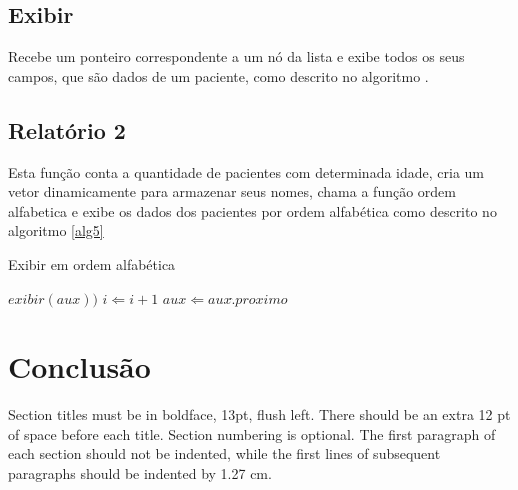 \documentclass[12pt]{article}
\begin{document}
\subsection{Exibir}

Recebe um ponteiro correspondente a um nó da lista e exibe todos os seus campos,
que são dados de um paciente, como descrito no algoritmo .


\subsection{Relatório 2}

Esta função conta a quantidade de pacientes com determinada idade, cria um vetor dinamicamente
para armazenar seus nomes, chama a função ordem alfabetica e exibe os dados dos pacientes por ordem
alfabética como descrito no algoritmo \ref{alg5}

\begin{algorithm}                      %
\caption{Exibir em ordem alfabética}          %
\label{alg5}                           %
\begin{algorithmic}
            \STATE $exibir(aux))$
            \STATE $i \Leftarrow i+1$
          \ENDIF
      \ENDWHILE
      \STATE $aux \Leftarrow aux\hat.proximo$
  \ENDWHILE
\end{algorithmic}
\end{algorithm}  



\section{Conclusão}

Section titles must be in boldface, 13pt, flush left. There should be an extra
12 pt of space before each title. Section numbering is optional. The first
paragraph of each section should not be indented, while the first lines of
subsequent paragraphs should be indented by 1.27 cm.



\end{document}
